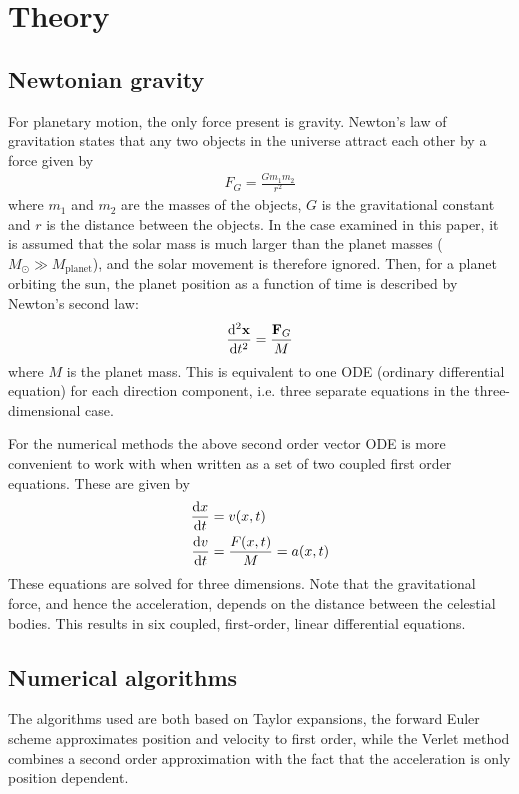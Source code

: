 \documentclass[aps,reprint]{revtex4-1}
\begin{document}
\section{Theory}
\label{sec:theory}
\subsection{Newtonian gravity}
For planetary motion, the only force present is gravity. Newton's law of gravitation
states that any two objects in the universe attract each other by a force given
by
\begin{align}
  F_G = \frac{G m_1 m_2}{r^2}
\end{align}
where $m_1$ and $m_2$ are the masses of the objects, $G$ is the
gravitational constant and $r$ is the distance between the objects. In the
case examined in this paper, it is assumed that the solar mass is much larger
than the planet masses ($M_\odot \gg M_\text{planet}$), and the solar
movement is therefore ignored. Then, for a planet orbiting the sun, the
planet position as a function of time is described by Newton's second law:
\begin{align*}
  \dv[2]{\mathbf{x}}{t} = \frac{\mathbf{F}_G}{M}
\end{align*}
where $M$ is the planet mass. This is equivalent to one ODE (ordinary differential
equation) for each direction component, i.e. three separate equations in the
three-dimensional case.

For the numerical methods the above second order vector ODE is more convenient to
work with when written as a set of two coupled first order equations. These
are given by
\begin{align}
  \begin{split}
  \label{eq:coupledequations}
  \dv{x}{t} &= v(x,t) \\
  \dv{v}{t} &= \frac{F(x,t)}{M} = a(x,t)
  \end{split}
\end{align}
These equations are solved for three dimensions. Note that the gravitational force,
and hence the acceleration, depends on the distance between the celestial bodies.
This results in six coupled, first-order, linear differential equations.

\subsection{Numerical algorithms}
The algorithms used are both based on Taylor expansions, the forward Euler
scheme approximates position and velocity to first order, while the Verlet
method combines a second order approximation with the fact that the acceleration
is only position dependent.
\end{document}
